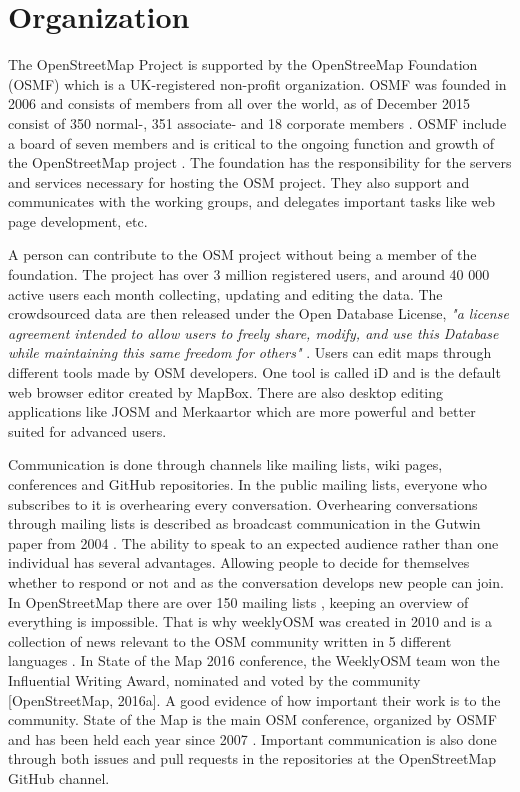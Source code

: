 \section{Organization}
The OpenStreetMap Project is supported by the OpenStreeMap Foundation (OSMF) which is a UK-registered non-profit organization. OSMF was founded in 2006 and consists of members from all over the world, as of December 2015 consist of 350 normal-, 351 associate- and 18 corporate members \cite{OSMF2015}. OSMF include a board of seven members and is critical to the ongoing function and growth of the OpenStreetMap project \cite{OSMF}.  The foundation has the responsibility for the servers and services necessary for hosting the OSM project. They also support and communicates with the working groups, and delegates important tasks like web page development, etc. 

A person can contribute to the OSM project without being a member of the foundation. The project has over 3 million registered users, and around 40 000 active users each month \cite{ OSMstats2016} collecting, updating and editing the data. The crowdsourced data are then released under the Open Database License, \textit{"a license agreement intended to allow users to freely share, modify, and use this Database while maintaining this same freedom for others"} \cite{ODbL}.  Users can edit maps through different tools made by OSM developers. One tool is called iD and is the default web browser editor created by MapBox. There are also desktop editing applications like JOSM and Merkaartor which are more powerful and better suited for advanced users. 

Communication is done through channels like mailing lists, wiki pages, conferences and GitHub repositories. In the public mailing lists, everyone who subscribes to it is overhearing every conversation. Overhearing conversations through mailing lists is described as broadcast communication in the Gutwin paper from 2004 \cite{Gutwin2004}. The ability to speak to an expected audience rather than one individual has several advantages. Allowing people to decide for themselves whether to respond or not and as the conversation develops new people can join. In OpenStreetMap there are over 150 mailing lists \cite{Reiter2016}, keeping an overview of everything is impossible. That is why weeklyOSM was created in 2010 and is a collection of news relevant to the OSM community written in 5 different languages \cite{Freyfogle2016}.  In State of the Map 2016 conference, the WeeklyOSM team won the Influential Writing Award, nominated and voted by the community [OpenStreetMap, 2016a]. A good evidence of how important their work is to the community. State of the Map is the main OSM conference, organized by OSMF and has been held each year since 2007 \cite{OpenStreetMapj}. Important communication is also done through both issues and pull requests in the repositories at the OpenStreetMap GitHub channel. 

